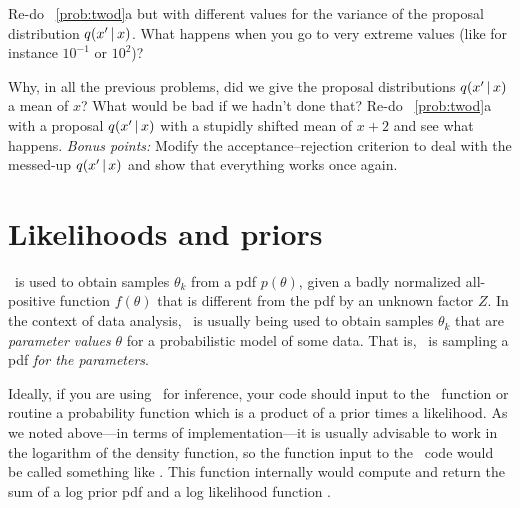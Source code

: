 \documentclass[modern]{aastex61}
\newcommand{\MCMC}{\acronym{MCMC}}
\newcommand{\pars}{\theta}
\begin{document}
\begin{problem}\label{prob:MH-sigma}
Re-do \problemname~\ref{prob:twod}a but with different values for
the variance of the proposal distribution $q(x'\,|\, x)$.
What happens when you go to very extreme values (like for instance
$10^{-1}$ or $10^2$)?
\end{problem}

\begin{problem}\label{prob:prop-mean}
Why, in all the previous problems, did we give the proposal
distributions $q(x'\,|\, x)$ a mean of $x$?
What would be bad if we hadn't done that?
Re-do \problemname~\ref{prob:twod}a with a proposal $q(x'\,|\, x)$ with a
stupidly shifted mean of $x + 2$ and see what happens.
\emph{Bonus points:} Modify the acceptance--rejection criterion to deal with
the messed-up $q(x'\,|\, x)$ and show that everything works once
again.
\end{problem}

\section{Likelihoods and priors}\label{sec:likelihood}
\nopagebreak
\MCMC\ is used to obtain samples $\pars_k$ from a pdf $p(\pars)$,
  given a badly normalized all-positive function $f(\pars)$
  that is different from the pdf by an unknown factor $Z$.
In the context of data analysis,
  \MCMC\ is usually being used to obtain samples $\pars_k$
  that are \emph{parameter values} $\pars$ for a probabilistic model of some data.
That is, \MCMC\ is sampling a pdf \emph{for the parameters}.

Ideally, if you are using \MCMC\ for inference, your code should input
to the \MCMC\ function or routine a probability function which is a
product of a prior times a likelihood.
As we noted above---in terms of implementation---it is usually advisable to work in the
logarithm of the density function, so the function input to the \MCMC\ code
would be called something like .
This function  internally would compute and return the
sum of a log prior pdf  and a log likelihood function
.
\end{document}
